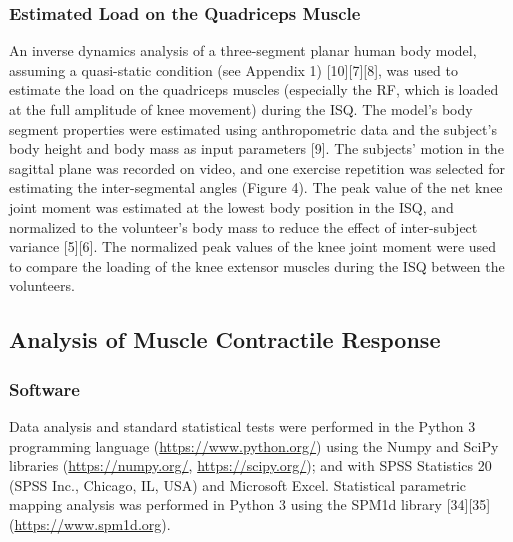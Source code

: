 \documentclass[utf8]{style/FrontiersinHarvard}
\begin{document}
\subsubsection{Estimated Load on the Quadriceps Muscle}
An inverse dynamics analysis of a three-segment planar human body model, assuming a quasi-static condition (see Appendix 1) [10][7][8], was used to estimate the load on the quadriceps muscles (especially the RF, which is loaded at the full amplitude of knee movement) during the ISQ.
The model's body segment properties were estimated using anthropometric data and the subject’s body height and body mass as input parameters [9].
The subjects' motion in the sagittal plane was recorded on video, and one exercise repetition was selected for estimating the inter-segmental angles (Figure 4).
The peak value of the net knee joint moment was estimated at the lowest body position in the ISQ,
and normalized to the volunteer’s body mass to reduce the effect of inter-subject variance [5][6].
The normalized peak values of the knee joint moment were used to compare the loading of the knee extensor muscles during the ISQ between the volunteers.

\subsection{Analysis of Muscle Contractile Response} \label{ss:analysis}

\subsubsection{Software}
Data analysis and standard statistical tests were performed in the Python 3 programming language (\url{https://www.python.org/}) using the Numpy and SciPy libraries (\url{https://numpy.org/}, \url{https://scipy.org/});
and with SPSS Statistics 20 (SPSS Inc., Chicago, IL, USA) and Microsoft Excel.
Statistical parametric mapping analysis was performed in Python 3 using the SPM1d library [34][35] (\url{https://www.spm1d.org}).
\end{document}
